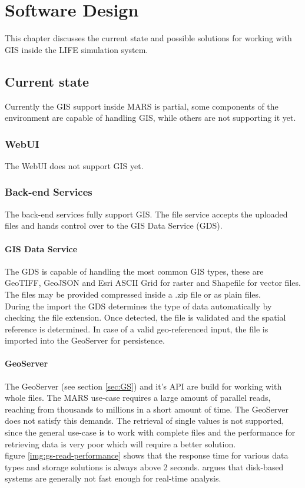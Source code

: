 
\chapter{Software Design}
\label{sec:software_design}
This chapter discusses the current state and possible solutions for working with GIS inside the LIFE simulation system.



\section{Current state}
Currently the GIS support inside MARS is partial, some components of the environment are capable of handling GIS, while others are not supporting it yet.


\subsection{WebUI}
The WebUI does not support GIS yet. 


\subsection{Back-end Services}
The back-end services fully support GIS. The file service accepts the uploaded files and hands control over to the GIS Data Service (GDS). 

\subsubsection{GIS Data Service}
The GDS is capable of handling the most common GIS types, these are GeoTIFF, GeoJSON and Esri ASCII Grid for raster and Shapefile for vector files. The files may be provided compressed inside a .zip file or as plain files.\\
During the import the GDS determines the type of data automatically by checking the file extension. Once detected, the file is validated and the spatial reference is determined. In case of a valid geo-referenced input, the file is imported into the GeoServer for persistence.

\subsubsection{GeoServer}
The GeoServer (see section \ref{sec:GS}) and it's API are build for working with whole files. The MARS use-case requires a large amount of parallel reads, reaching from thousands to millions in a short amount of time. The GeoServer does not satisfy this demands. The retrieval of single values is not supported, since the general use-case is to work with complete files and the performance for retrieving data is very poor which will require a better solution.\\
figure \ref{img:gs-read-performance} shows that the response time for various data types and storage solutions is always above 2 seconds. \cite{Pandey2016} argues that disk-based systems are generally not fast enough for real-time analysis.

